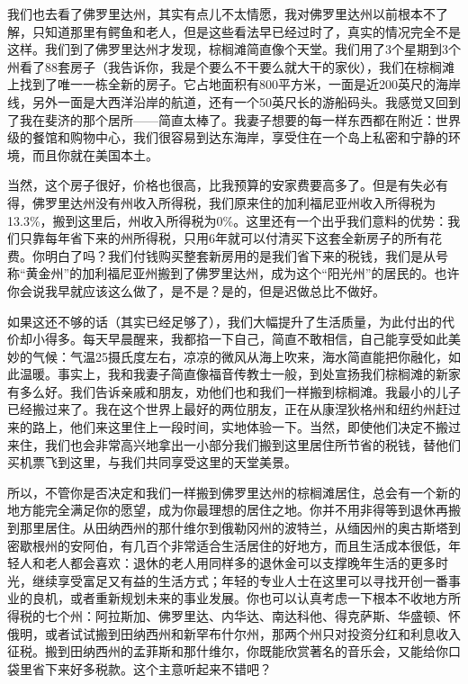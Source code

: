 我们也去看了佛罗里达州，其实有点儿不太情愿，我对佛罗里达州以前根本不了解，只知道那里有鳄鱼和老人，但是这些看法早已经过时了，真实的情况完全不是这样。我们到了佛罗里达州才发现，棕榈滩简直像个天堂。我们用了3个星期到3个州看了88套房子（我告诉你，我是个要么不干要么就大干的家伙），我们在棕榈滩上找到了唯一一栋全新的房子。它占地面积有800平方米，一面是近200英尺的海岸线，另外一面是大西洋沿岸的航道，还有一个50英尺长的游船码头。我感觉又回到了我在斐济的那个居所——简直太棒了。我妻子想要的每一样东西都在附近：世界级的餐馆和购物中心，我们很容易到达东海岸，享受住在一个岛上私密和宁静的环境，而且你就在美国本土。

当然，这个房子很好，价格也很高，比我预算的安家费要高多了。但是有失必有得，佛罗里达州没有州收入所得税，我们原来住的加利福尼亚州收入所得税为13.3\%，搬到这里后，州收入所得税为0\%。这里还有一个出乎我们意料的优势：我们只靠每年省下来的州所得税，只用6年就可以付清买下这套全新房子的所有花费。你明白了吗？我们付钱购买整套新房用的是我们省下来的税钱，我们是从号称“黄金州”的加利福尼亚州搬到了佛罗里达州，成为这个“阳光州”的居民的。也许你会说我早就应该这么做了，是不是？是的，但是迟做总比不做好。

如果这还不够的话（其实已经足够了），我们大幅提升了生活质量，为此付出的代价却小得多。每天早晨醒来，我都掐一下自己，简直不敢相信，自己能享受如此美妙的气候：气温25摄氏度左右，凉凉的微风从海上吹来，海水简直能把你融化，如此温暖。事实上，我和我妻子简直像福音传教士一般，到处宣扬我们棕榈滩的新家有多么好。我们告诉亲戚和朋友，劝他们也和我们一样搬到棕榈滩。我最小的儿子已经搬过来了。我在这个世界上最好的两位朋友，正在从康涅狄格州和纽约州赶过来的路上，他们来这里住上一段时间，实地体验一下。当然，即使他们决定不搬过来住，我们也会非常高兴地拿出一小部分我们搬到这里居住所节省的税钱，替他们买机票飞到这里，与我们共同享受这里的天堂美景。

所以，不管你是否决定和我们一样搬到佛罗里达州的棕榈滩居住，总会有一个新的地方能完全满足你的愿望，成为你最理想的居住之地。你并不用非得等到退休再搬到那里居住。从田纳西州的那什维尔到俄勒冈州的波特兰，从缅因州的奥古斯塔到密歇根州的安阿伯，有几百个非常适合生活居住的好地方，而且生活成本很低，年轻人和老人都会喜欢：退休的老人用同样多的退休金可以支撑晚年生活的更多时光，继续享受富足又有益的生活方式；年轻的专业人士在这里可以寻找开创一番事业的良机，或者重新规划未来的事业发展。你也可以认真考虑一下根本不收地方所得税的七个州：阿拉斯加、佛罗里达、内华达、南达科他、得克萨斯、华盛顿、怀俄明，或者试试搬到田纳西州和新罕布什尔州，那两个州只对投资分红和利息收入征税。搬到田纳西州的孟菲斯和那什维尔，你既能欣赏著名的音乐会，又能给你口袋里省下来好多税款。这个主意听起来不错吧？

